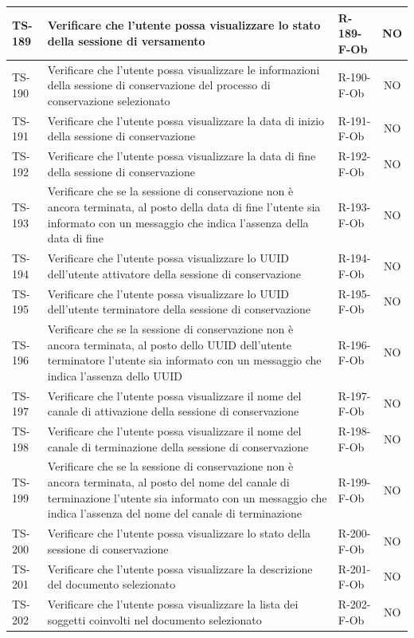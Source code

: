 \documentclass[a4paper,12pt]{article}
\begin{document}
\begin{longtable}{|p{1.5cm}|p{8.3cm}|p{2.4cm}|c|}
\hline
TS-189 & Verificare che l'utente possa visualizzare lo stato della sessione di versamento & R-189-F-Ob & NO \\
\hline
TS-190 & Verificare che l'utente possa visualizzare le informazioni della sessione di conservazione del processo di conservazione selezionato & R-190-F-Ob & NO \\
\hline
TS-191 & Verificare che l'utente possa visualizzare la data di inizio della sessione di conservazione & R-191-F-Ob & NO \\
\hline
TS-192 & Verificare che l'utente possa visualizzare la data di fine della sessione di conservazione & R-192-F-Ob & NO \\
\hline
TS-193 & Verificare che se la sessione di conservazione non è ancora terminata, al posto della data di fine l'utente sia informato con un messaggio che indica l'assenza della data di fine & R-193-F-Ob & NO \\
\hline
TS-194 & Verificare che l'utente possa visualizzare lo UUID dell'utente attivatore della sessione di conservazione & R-194-F-Ob & NO \\
\hline
TS-195 & Verificare che l'utente possa visualizzare lo UUID dell'utente terminatore della sessione di conservazione & R-195-F-Ob & NO \\
\hline
TS-196 & Verificare che se la sessione di conservazione non è ancora terminata, al posto dello UUID dell'utente terminatore l'utente sia informato con un messaggio che indica l'assenza dello UUID & R-196-F-Ob & NO \\
\hline
TS-197 & Verificare che l'utente possa visualizzare il nome del canale di attivazione della sessione di conservazione & R-197-F-Ob & NO \\
\hline
TS-198 & Verificare che l'utente possa visualizzare il nome del canale di terminazione della sessione di conservazione & R-198-F-Ob & NO \\
\hline
TS-199 & Verificare che se la sessione di conservazione non è ancora terminata, al posto del nome del canale di terminazione l'utente sia informato con un messaggio che indica l'assenza del nome del canale di terminazione & R-199-F-Ob & NO \\
\hline
TS-200 & Verificare che l'utente possa visualizzare lo stato della sessione di conservazione & R-200-F-Ob & NO \\
\hline
TS-201 & Verificare che l'utente possa visualizzare la descrizione del documento selezionato & R-201-F-Ob & NO \\
\hline
TS-202 & Verificare che l'utente possa visualizzare la lista dei soggetti coinvolti nel documento selezionato & R-202-F-Ob & NO \\

\end{longtable}
\end{document}
